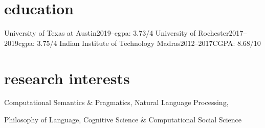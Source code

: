 \documentclass[10pt,a4paper]{mycv}
\begin{document}
\cfoot{\sansc \thepage}
\makecvtitle


\section{education}
    {University of Texas at Austin}{2019--}{\rmsc cgpa: 3.73/4}{}
    {University of Rochester}{2017--2019}{\rmsc cgpa: 3.75/4}{}
    {Indian Institute of Technology Madras}{2012--2017}{\rmsc CGPA: 8.68/10}{}

\section{research interests}

{\large Computational Semantics \& Pragmatics, Natural Language Processing,

\vspace{0.5ex}

Philosophy of Language, Cognitive Science \& Computational Social Science}
\end{document}
